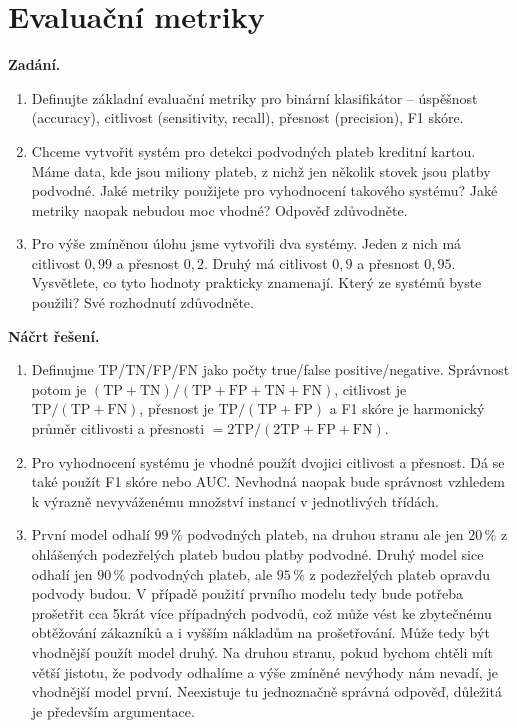 \section{Evaluační metriky}

\noindent\textbf{Zadání.}\par
\begin{enumerate}
  \item Definujte základní evaluační metriky pro binární klasifikátor -- úspěšnost (accuracy),
    citlivost (sensitivity, recall), přesnost (precision), F1 skóre.
  \item Chceme vytvořit systém pro detekci podvodných plateb kreditní kartou. Máme data, kde jsou miliony
    plateb, z nichž jen několik stovek jsou platby podvodné. Jaké metriky použijete pro vyhodnocení takového
    systému? Jaké metriky naopak nebudou moc vhodné? Odpověď zdůvodněte.
  \item Pro výše zmíněnou úlohu jsme vytvořili dva systémy. Jeden z nich má citlivost $0{,}99$ a přesnost
    $0{,}2$. Druhý má citlivost $0{,}9$ a přesnost $0{,}95$. Vysvětlete, co tyto hodnoty prakticky znamenají.
    Který ze systémů byste použili? Své rozhodnutí zdůvodněte.
\end{enumerate}

\medskip
\noindent\textbf{Náčrt řešení.}\par
\begin{enumerate}
  \item Definujme TP/TN/FP/FN jako počty true/false positive/negative. Správnost potom je
    $(\mathrm{TP}+\mathrm{TN})/(\mathrm{TP}+\mathrm{FP}+\mathrm{TN}+\mathrm{FN})$, citlivost je
    $\mathrm{TP}/(\mathrm{TP}+\mathrm{FN})$, přesnost je $\mathrm{TP}/(\mathrm{TP}+\mathrm{FP})$
    a F1 skóre je harmonický průměr citlivosti a přesnosti $= 2\mathrm{TP}/(2\mathrm{TP}+\mathrm{FP}+\mathrm{FN})$.
  \item Pro vyhodnocení systému je vhodné použít dvojici citlivost a přesnost. Dá se také použít F1 skóre
    nebo AUC. Nevhodná naopak bude správnost vzhledem k výrazně nevyváženému množství instancí v jednotlivých třídách.
  \item První model odhalí $99\,\%$ podvodných plateb, na druhou stranu ale jen $20\,\%$ z ohlášených
    podezřelých plateb budou platby podvodné. Druhý model sice odhalí jen $90\,\%$ podvodných plateb,
    ale $95\,\%$ z podezřelých plateb opravdu podvody budou. V případě použití prvního modelu tedy bude
    potřeba prošetřit cca 5krát více případných podvodů, což může vést ke zbytečnému obtěžování zákazníků
    a i vyšším nákladům na prošetřování. Může tedy být vhodnější použít model druhý. Na druhou stranu,
    pokud bychom chtěli mít větší jistotu, že podvody odhalíme a výše zmíněné nevýhody nám nevadí, je
    vhodnější model první. Neexistuje tu jednoznačně správná odpověď, důležitá je především argumentace.
\end{enumerate}
